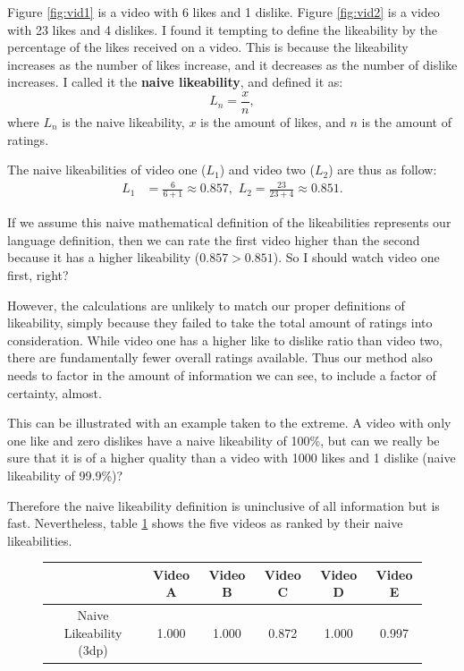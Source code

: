 \documentclass[a4paper,11pt]{article}
\begin{document}
Figure \ref{fig:vid1} is a video with 6 likes and 1 dislike. Figure \ref{fig:vid2} is a video with 23 likes and 4 dislikes. I found it tempting to define the likeability by the percentage of the likes received on a video. This is because the likeability increases as the number of likes increase, and it decreases as the number of dislike increases. I called it the \textbf{naive likeability}, and defined it as:
\[
L_n = \frac{x}{n},
\]
where $L_n$ is the naive likeability, $x$ is the amount of likes, and $n$ is the amount of ratings.

The naive likeabilities of video one ($L_1$) and video two ($L_2$) are thus as follow:
\begin{align*}
    L_{1} &= \frac{6}{6+1} \approx 0.857, \,\, L_{2} = \frac{23}{23 + 4} \approx 0.851.
\end{align*}

If we assume this naive mathematical definition of the likeabilities represents our language definition, then we can rate the first video higher than the second because it has a higher likeability ($0.857 > 0.851$). So I should watch video one first, right?

However, the calculations are unlikely to match our proper definitions of likeability, simply because they failed to take the total amount of ratings into consideration. While video one has a higher like to dislike ratio than video two, there are fundamentally fewer overall ratings available. Thus our method also needs to factor in the amount of information we can see, to include a factor of certainty, almost.

This can be illustrated with an example taken to the extreme. A video with only one like and zero dislikes have a naive likeability of 100\%, but can we really be sure that it is of a higher quality than a video with 1000 likes and 1 dislike (naive likeability of 99.9\%)?

Therefore the naive likeability definition is uninclusive of all information but is fast. Nevertheless, table \ref{tbl:naive} shows the five videos as ranked by their naive likeabilities.

\begin{figure}[H]
    \centering
    \begin{tabular}{c|c|c|c|c|c}
        & Video A & Video B & Video C & Video D & Video E \\
        \hline
        \hline
        Naive Likeability (3dp) & 1.000 & 1.000 & 0.872 & 1.000 & 0.997
    \end{tabular}
    \label{tbl:naive}
\end{figure}
\end{document}
